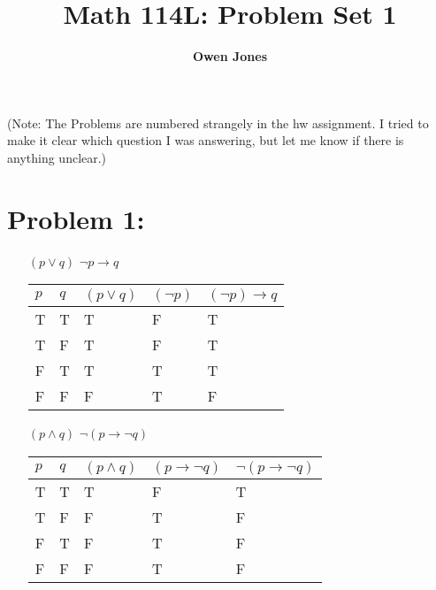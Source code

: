 \documentclass[10pt]{article}
\title{\bf Math 114L\@: Problem Set 1}
\author{\bf Owen Jones}
\begin{document}
\maketitle
\noindent
(Note: The Problems are numbered strangely in the hw assignment. I tried to make it clear which question I was answering, but let me know if there is anything unclear.)
\section*{Problem 1:}
\begin{itemize}
    \item [$(p\lor q)$] $\lnot p\rightarrow q$\\
    \begin{table}[h]
        \begin{tabular}{|l|l|l|l|l|}
        \hline
        $p$ & $q$ & $(p\lor q)$ & $(\lnot p)$ & $(\lnot p)\rightarrow q$ \\ \hline
        T   & T   & T           & F         & T                        \\ \hline
        T   & F   & T           & F         & T                        \\ \hline
        F   & T   & T           & T         & T                        \\ \hline
        F   & F   & F           & T         & F                        \\ \hline
        \end{tabular}
        \end{table}
    \item [$(p\land q)$] $\lnot (p\rightarrow \lnot q)$\\
    \begin{table}[h]
        \begin{tabular}{|l|l|l|l|l|}
        \hline
        $p$ & $q$ & $(p\land q)$ & $(p\rightarrow \lnot q)$ & $\lnot (p\rightarrow \lnot q)$ \\ \hline
        T   & T   & T            & F                        & T                              \\ \hline
        T   & F   & F            & T                        & F                              \\ \hline
        F   & T   & F            & T                        & F                              \\ \hline
        F   & F   & F            & T                        & F                              \\ \hline
        \end{tabular}
        \end{table}
\end{itemize}
\end{document}
